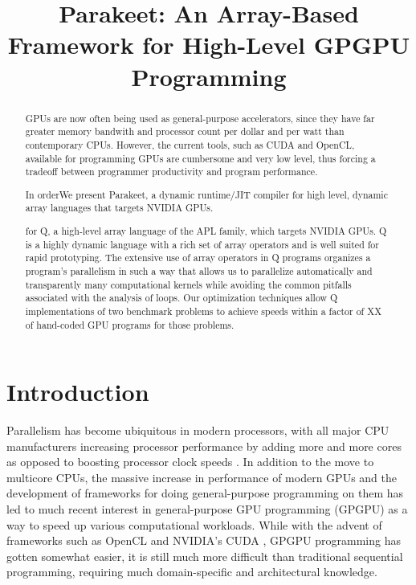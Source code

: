 \documentclass[preprint]{sigplanconf}
\begin{document}


\title{Parakeet: An Array-Based Framework for High-Level GPGPU Programming}

\maketitle

\begin{abstract}
GPUs are now often being used as general-purpose accelerators, since they have
far greater memory bandwith and processor count per dollar and per watt than
contemporary CPUs.  However, the current tools, such as CUDA and OpenCL,
available for programming GPUs are cumbersome and very low level, thus forcing
a tradeoff between programmer productivity and program performance.

In orderWe present Parakeet, a dynamic runtime/JIT compiler for high level,
dynamic array languages that targets NVIDIA GPUs.

for Q,  a high-level array
language of the APL family, which targets NVIDIA GPUs. Q is a highly dynamic
language with a rich set of
array operators and is well suited for rapid prototyping. The extensive use of
array operators in Q programs organizes a program's parallelism in such a way
that allows us to parallelize automatically and transparently
many computational kernels while avoiding the common pitfalls
associated with the analysis of loops. Our optimization techniques allow Q
implementations of two benchmark problems to achieve speeds within a
factor of XX of hand-coded GPU programs for those problems.
\end{abstract}

\section{Introduction}

Parallelism has become ubiquitous in modern processors, with all major CPU
manufacturers increasing processor performance by adding more and more cores as
opposed to boosting processor clock speeds \cite{Asan06}.  In addition to the
move to multicore CPUs, the massive increase in performance
of modern GPUs and the development of frameworks for doing general-purpose
programming on them has led to much recent interest in general-purpose GPU
programming (GPGPU) as a way to speed up various computational workloads. While
with the advent of frameworks such as OpenCL \cite{Muns10} and NVIDIA's CUDA
\cite{NvidCU}, GPGPU programming has gotten somewhat easier, it is still much
more difficult than traditional sequential programming, requiring much
domain-specific and architectural knowledge.
\end{document}
